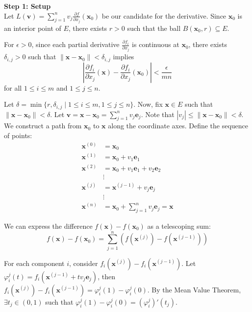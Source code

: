 \begin{pfbox}

\noindent \textbf{Step 1: Setup}\\
Let $L(\mathbf{v}) = \sum_{j=1}^n v_j \frac{\partial f}{\partial x_j}(\mathbf{x}_0)$ be our candidate for the derivative.
Since $\mathbf{x}_0$ is an interior point of $E$, there exists $r > 0$ such that the ball $B(\mathbf{x}_0, r) \subseteq E$.

For $\epsilon > 0$, since each partial derivative $\frac{\partial f_i}{\partial x_j}$ is continuous at $\mathbf{x}_0$, there exists $\delta_{i,j} > 0$ such that $\|\mathbf{x} - \mathbf{x}_0\| < \delta_{i,j}$ implies
$$\left| \frac{\partial f_i}{\partial x_j}(\mathbf{x}) - \frac{\partial f_i}{\partial x_j}(\mathbf{x}_0) \right| < \frac{\epsilon}{mn}$$
for all $1 \le i \le m$ and $1 \le j \le n$.

Let $\delta = \min\{r, \delta_{i,j} \mid 1 \le i \le m, 1\le j \le n\}$.
Now, fix $\mathbf{x} \in E$ such that $\|\mathbf{x} - \mathbf{x}_0\| < \delta$. Let $\mathbf{v} = \mathbf{x} - \mathbf{x}_0 = \sum_{j=1}^n v_j \mathbf{e}_j$. Note that $|v_j| \le \|\mathbf{x} - \mathbf{x}_0\| < \delta$.
We construct a path from $\mathbf{x}_0$ to $\mathbf{x}$ along the coordinate axes. Define the sequence of points:
\begin{align*}
\mathbf{x}^{(0)} &= \mathbf{x}_0 \\
\mathbf{x}^{(1)} &= \mathbf{x}_0 + v_1 \mathbf{e}_1 \\
\mathbf{x}^{(2)} &= \mathbf{x}_0 + v_1 \mathbf{e}_1 + v_2 \mathbf{e}_2 \\
&\vdots \\
\mathbf{x}^{(j)} &= \mathbf{x}^{(j-1)} + v_j \mathbf{e}_j \\
&\vdots \\
\mathbf{x}^{(n)} &= \mathbf{x}_0 + \sum_{j=1}^n v_j \mathbf{e}_j = \mathbf{x}
\end{align*}

We can express the difference $f(\mathbf{x}) - f(\mathbf{x}_0)$ as a telescoping sum:
$$f(\mathbf{x}) - f(\mathbf{x}_0) = \sum_{j=1}^n \left( f(\mathbf{x}^{(j)}) - f(\mathbf{x}^{(j-1)}) \right)$$

For each component $i$, consider $f_i(\mathbf{x}^{(j)}) - f_i(\mathbf{x}^{(j-1)})$. 
Let $\varphi_i^j(t) = f_i(\mathbf{x}^{(j-1)} + t v_j \mathbf{e}_j)$, then $f_i(\mathbf{x}^{(j)}) - f_i(\mathbf{x}^{(j-1)}) = \varphi^j_i(1)-\varphi^j_i(0)$.
By the Mean Value Theorem, $\exists t_j\in (0,1)$ such that $\varphi^j_i(1)-\varphi^j_i(0) = (\varphi^j_i)'(t_j)$. 


\end{pfbox}
